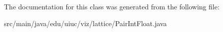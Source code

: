 The documentation for this class was generated from the following file\+:\begin{DoxyCompactItemize}
\item 
src/main/java/edu/uiuc/viz/lattice/Pair\+Int\+Float.\+java\end{DoxyCompactItemize}
